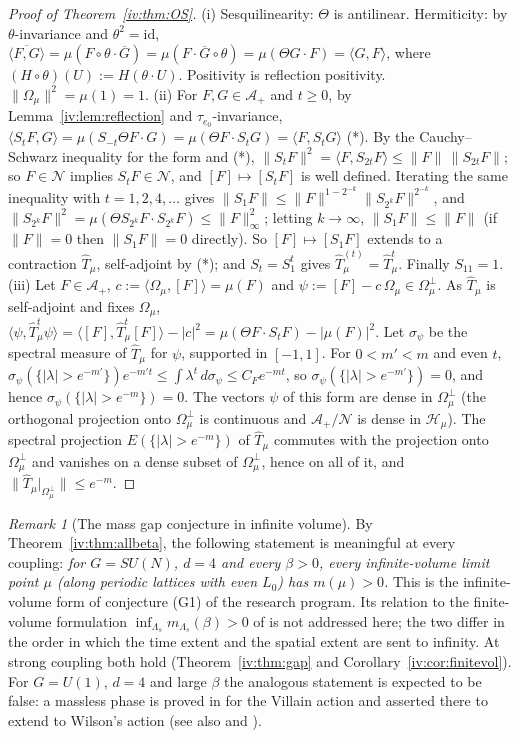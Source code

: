 \documentclass[11pt,a4paper]{article}
\theoremstyle{definition}
\theoremstyle{remark}
\newtheorem{remark}[theorem]{Remark}
\newcommand{\cH}{\mathcal{H}}
\newcommand{\cA}{\mathcal{A}}
\newcommand{\cN}{\mathcal{N}}
\newcommand{\hT}{\hat{T}}
\newcommand{\ip}[2]{\langle #1,#2\rangle}
\newcommand{\norm}[1]{\lVert #1\rVert}
\newcommand{\IIIref}[3]{\cite[#1~`#2' (\texttt{#3})]{III}}
\begin{document}
\begin{proof}[Proof of Theorem~\ref{iv:thm:OS}]
(i) Sesquilinearity: $\Theta$ is antilinear. Hermiticity: by $\theta$-invariance and $\theta^2=\mathrm{id}$,
$\overline{\ip FG}=\mu(F\circ\theta\cdot\overline G)=\mu(F\cdot\overline{G}\circ\theta)=\mu(\Theta G\cdot F)=\ip GF$, where
$(H\circ\theta)(U):=H(\theta\cdot U)$. Positivity is reflection positivity. $\norm{\Omega_\mu}^2=\mu(1)=1$.
(ii) For $F,G\in\cA_+$ and $t\ge0$, by Lemma~\ref{iv:lem:reflection} and $\tau_{e_0}$-invariance,
$\ip{S_tF}G=\mu(S_{-t}\Theta F\cdot G)=\mu(\Theta F\cdot S_tG)=\ip F{S_tG}$ (*). By the Cauchy--Schwarz inequality for the form and (*),
$\norm{S_tF}^2=\ip F{S_{2t}F}\le\norm F\,\norm{S_{2t}F}$; so $F\in\cN$ implies $S_tF\in\cN$, and $[F]\mapsto[S_tF]$ is well defined. Iterating
the same inequality with $t=1,2,4,\dots$ gives $\norm{S_1F}\le\norm F^{1-2^{-k}}\norm{S_{2^k}F}^{2^{-k}}$, and
$\norm{S_{2^k}F}^2=\mu(\Theta S_{2^k}F\cdot S_{2^k}F)\le\norm F_\infty^2$; letting $k\to\infty$, $\norm{S_1F}\le\norm F$ (if $\norm F=0$ then
$\norm{S_1F}=0$ directly). So $[F]\mapsto[S_1F]$ extends to a contraction $\hT_\mu$, self-adjoint by (*); and $S_t=S_1^t$ gives
$\hT^{(t)}_\mu=\hT_\mu^t$. Finally $S_11=1$.
(iii) Let $F\in\cA_+$, $c:=\ip{\Omega_\mu}{[F]}=\mu(F)$ and $\psi:=[F]-c\,\Omega_\mu\in\Omega_\mu^\perp$. As $\hT_\mu$ is self-adjoint
and fixes $\Omega_\mu$, $\ip\psi{\hT^t_\mu\psi}=\ip{[F]}{\hT_\mu^t[F]}-|c|^2=\mu(\Theta F\cdot S_tF)-|\mu(F)|^2$. Let $\sigma_\psi$ be the
spectral measure of $\hT_\mu$ for $\psi$, supported in $[-1,1]$. For $0<m'<m$ and even $t$,
$\sigma_\psi(\{|\lambda|>e^{-m'}\})e^{-m't}\le\int\lambda^t\,d\sigma_\psi\le C_Fe^{-mt}$, so $\sigma_\psi(\{|\lambda|>e^{-m'}\})=0$, and
hence $\sigma_\psi(\{|\lambda|>e^{-m}\})=0$. The vectors $\psi$ of this form are dense in $\Omega_\mu^\perp$ (the orthogonal projection
onto $\Omega_\mu^\perp$ is continuous and $\cA_+/\cN$ is dense in $\cH_\mu$). The spectral projection $E(\{|\lambda|>e^{-m}\})$ of
$\hT_\mu$ commutes with the projection onto $\Omega_\mu^\perp$ and vanishes on a dense subset of $\Omega_\mu^\perp$, hence on all of it,
and $\norm{\hT_\mu|_{\Omega_\mu^\perp}}\le e^{-m}$.
\end{proof}

\begin{remark}[The mass gap conjecture in infinite volume]\label{iv:rem:G1}
By Theorem~\ref{iv:thm:allbeta}, the following statement is meaningful at every coupling: \emph{for $G=SU(N)$, $d=4$ and every
$\beta>0$, every infinite-volume limit point $\mu$ (along periodic lattices with even $L_0$) has $m(\mu)>0$.} This is the
infinite-volume form of conjecture (G1) of the research program. Its relation to the finite-volume formulation
$\inf_{\Lambda_s}m_{\Lambda_s}(\beta)>0$ of \cite{F} is not addressed here; the two differ in the order in which the time extent and
the spatial extent are sent to infinity. At strong coupling both hold (Theorem~\ref{iv:thm:gap} and Corollary~\ref{iv:cor:finitevol}).
For $G=U(1)$, $d=4$ and large $\beta$ the analogous statement is expected to be false: a massless phase is proved in \cite{FS82}
for the Villain action and asserted there to extend to Wilson's action (see also \cite{Gut80} and \IIIref{Remark}{The $U(1)$
test}{al:rem:u1test}).
\end{remark}
\end{document}
